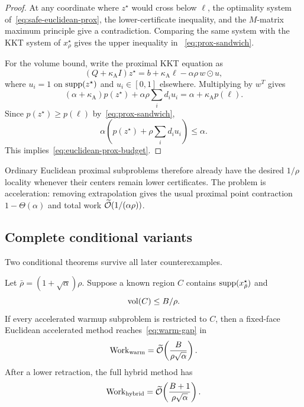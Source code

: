 \begin{proof}
At any coordinate where $z^\star$ would cross below $\ell$, the optimality
system of~\eqref{eq:safe-euclidean-prox}, the lower-certificate inequality,
and the $M$-matrix maximum principle give a contradiction.  Comparing the
same system with the KKT system of $x_\rho^\star$ gives the upper inequality in
~\eqref{eq:prox-sandwich}.

For the volume bound, write the proximal KKT equation as
\[
 (Q+\kappa_{\mathrm A} I)z^\star
 =b+\kappa_{\mathrm A}\ell-\alpha\rho\,w\odot u,
\]
where $u_i=1$ on $\operatorname{supp}(z^\star)$ and $u_i\in[0,1]$ elsewhere.  Multiplying by
$w^T$ gives
\[
 (\alpha+\kappa_{\mathrm A})p(z^\star)
 +\alpha\rho\sum_i d_i u_i
 =\alpha+\kappa_{\mathrm A} p(\ell).
\]
Since $p(z^\star)\ge p(\ell)$ by~\eqref{eq:prox-sandwich},
\[
 \alpha\left(p(z^\star)+\rho\sum_i d_i u_i\right)\le\alpha.
\]
This implies~\eqref{eq:euclidean-prox-budget}.
\end{proof}

Ordinary Euclidean proximal subproblems therefore already have the desired
$1/\rho$ locality whenever their centers remain lower certificates.  The
problem is acceleration: removing extrapolation gives the usual proximal
point contraction $1-\Theta(\alpha)$ and total work
$\widetilde{\mathcal{O}}(1/(\alpha\rho))$.

\subsection{Complete conditional variants}

Two conditional theorems survive all later counterexamples.

\begin{theorem}
\label{thm:bounded-core}
Let $\bar\rho=(1+\sqrt\alpha)\rho$.  Suppose a known region $C$ contains
$\operatorname{supp}(x_{\bar\rho}^\star)$ and
\begin{equation}
  \operatorname{vol}(C)\le B/\rho.
  \label{eq:bounded-core}
\end{equation}
If every accelerated warmup subproblem is restricted to $C$, then a
fixed-face Euclidean accelerated method reaches~\eqref{eq:warm-gap} in
\begin{equation}
 \operatorname{Work}_{\mathrm{warm}}
 =\widetilde{\mathcal{O}}\!\left(\frac{B}{\rho\sqrt\alpha}\right).
 \label{eq:bounded-core-work}
\end{equation}
After a lower retraction, the full hybrid method has
\[
 \operatorname{Work}_{\mathrm{hybrid}}
 =\widetilde{\mathcal{O}}\!\left(\frac{B+1}{\rho\sqrt\alpha}\right).
\]
\end{theorem}

